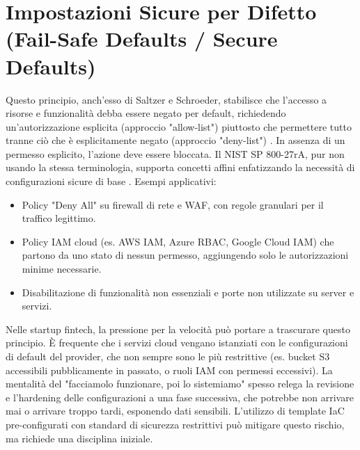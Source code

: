 \section{Impostazioni Sicure per Difetto (Fail-Safe Defaults / Secure Defaults)}
Questo principio, anch'esso di Saltzer e Schroeder, stabilisce che l'accesso a risorse e funzionalità debba essere negato per default, richiedendo un'autorizzazione esplicita (approccio "allow-list") piuttosto che permettere tutto tranne ciò che è esplicitamente negato (approccio "deny-list") \cite{Saltzer_Schroeder_1975}. In assenza di un permesso esplicito, l'azione deve essere bloccata. Il NIST SP 800-27rA, pur non usando la stessa terminologia, supporta concetti affini enfatizzando la necessità di configurazioni sicure di base \cite{NIST_SP_800_27rA}.
Esempi applicativi:
\begin{itemize}
\item Policy "Deny All" su firewall di rete e WAF, con regole granulari per il traffico legittimo.
\item Policy IAM cloud (es. AWS IAM, Azure RBAC, Google Cloud IAM) che partono da uno stato di nessun permesso, aggiungendo solo le autorizzazioni minime necessarie.
\item Disabilitazione di funzionalità non essenziali e porte non utilizzate su server e servizi.
\end{itemize}
Nelle startup fintech, la pressione per la velocità può portare a trascurare questo principio. È frequente che i servizi cloud vengano istanziati con le configurazioni di default del provider, che non sempre sono le più restrittive (es. bucket S3 accessibili pubblicamente in passato, o ruoli IAM con permessi eccessivi). La mentalità del "facciamolo funzionare, poi lo sistemiamo" spesso relega la revisione e l'hardening delle configurazioni a una fase successiva, che potrebbe non arrivare mai o arrivare troppo tardi, esponendo dati sensibili. L'utilizzo di template IaC pre-configurati con standard di sicurezza restrittivi può mitigare questo rischio, ma richiede una disciplina iniziale.


